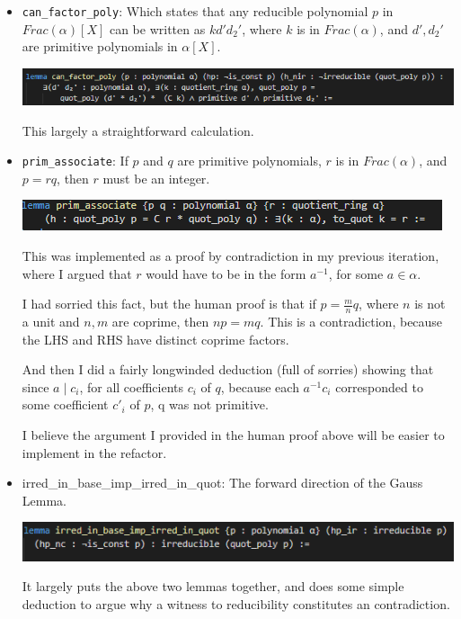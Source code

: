 \documentclass[pagesize=a4]{scrreprt}
\begin{document}
\begin{itemize}
    \item \texttt{can\_factor\_poly}: Which states that any reducible polynomial $p$ in $Frac(\alpha)[X]$ can be written as $kd'd_2'$, where $k$ is in $Frac(\alpha)$, and $d', d_2'$ are primitive polynomials in $ \alpha[X]$. 
    
        \includegraphics[width=\textwidth]{can_factor_poly.png}

    This largely a straightforward calculation. 

    \item \texttt{prim\_associate}: If $p$ and $q$ are primitive polynomials, $r$ is in $Frac(\alpha)$, and $p = rq$, then $r$ must be an integer. 
    
    \includegraphics{prim_associate.png}

    This was implemented as a proof by contradiction in my previous iteration, where I argued that $r$ would have to be in the form $a^{-1}$, for some $a \in \alpha$. 
    
    I had sorried this fact, but the human proof is that if $p = \frac{m}{n}q$, where $n$ is not a unit and $n, m$ are coprime, then $np = mq$. This is a contradiction, because the LHS and RHS have distinct coprime factors. 

    And then I did a fairly longwinded deduction (full of sorries) showing that since $a \mid c_i$, for all coefficients $c_i$ of $q$, because each $a^{-1}c_i$ corresponded to some coefficient $c'_i$ of $p$, q was not primitive. 

    I believe the argument I provided in the human proof above will be easier to implement in the refactor. 

     \item{irred\_in\_base\_imp\_irred\_in\_quot}: The forward direction of the Gauss Lemma. 
    
    \includegraphics{prod_base.png}

    It largely puts the above two lemmas together, and does some simple deduction to argue why a witness to reducibility constitutes an contradiction. 

\end{itemize}
\end{document}
